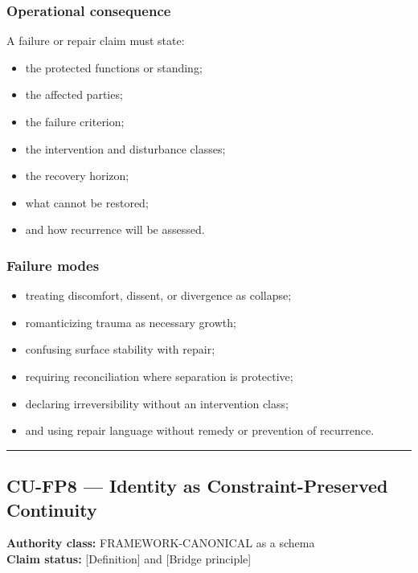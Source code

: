 \documentclass[
  11pt,
]{article}
\providecommand{\tightlist}{%
  \setlength{\itemsep}{0pt}\setlength{\parskip}{0pt}}
\begin{document}
\subsubsection{Operational consequence}\label{operational-consequence-6}

A failure or repair claim must state:

\begin{itemize}
\tightlist
\item
  the protected functions or standing;
\item
  the affected parties;
\item
  the failure criterion;
\item
  the intervention and disturbance classes;
\item
  the recovery horizon;
\item
  what cannot be restored;
\item
  and how recurrence will be assessed.
\end{itemize}

\subsubsection{Failure modes}\label{failure-modes-6}

\begin{itemize}
\tightlist
\item
  treating discomfort, dissent, or divergence as collapse;
\item
  romanticizing trauma as necessary growth;
\item
  confusing surface stability with repair;
\item
  requiring reconciliation where separation is protective;
\item
  declaring irreversibility without an intervention class;
\item
  and using repair language without remedy or prevention of recurrence.
\end{itemize}

\begin{center}\rule{0.5\linewidth}{0.5pt}\end{center}

\subsection{CU-FP8 --- Identity as Constraint-Preserved
Continuity}\label{cu-fp8-identity-as-constraint-preserved-continuity}

\textbf{Authority class:} FRAMEWORK-CANONICAL as a schema\\
\textbf{Claim status:} {[}Definition{]} and {[}Bridge principle{]}
\end{document}
